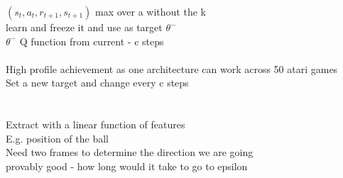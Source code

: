 \documentclass[11pt]{article}
\begin{document}
$(s_t, a_t, r_{t+1}, s_{t+1})$ max over a without the k\\
learn and freeze it and use as target $\theta^{-}$ \\
$\theta^{-}$ Q function from current - c steps\\\\
High profile achievement as one architecture can work across 50 atari games\\
Set a new target and change every c steps\\\\\\
Extract with a linear function of features\\
E.g. position of the ball
\\
Need two frames to determine the direction we are going\\
provably good - how long would it take to go to epsilon
\end{document}
